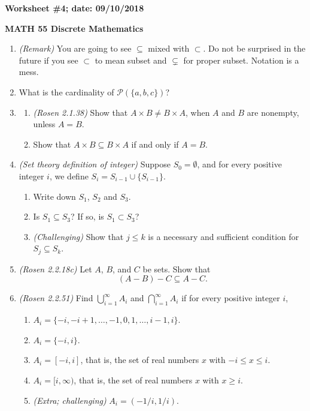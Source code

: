 \documentclass{article}
\begin{document}
{\bf Worksheet \#4; date: 09/10/2018}

{\bf MATH 55 Discrete Mathematics}

\begin{enumerate}
\item {\em (Remark)} You are going to see $\subseteq$ mixed with $\subset$. Do not be surprised in the future if you see $\subset$ to mean subset and $\subsetneq$ for proper subset. Notation is a mess.

\item What is the cardinality of $\mathcal{P}(\{a, b, c\})$?

\item
\begin{enumerate}
\item {\em (Rosen 2.1.38)} Show that $A \times B \ne B \times A$, when $A$ and $B$ are nonempty, unless $A = B$.
\item Show that $A \times B \subseteq B \times A$ if and only if $A = B$.
\end{enumerate}

\item {\em (Set theory definition of integer)} Suppose $S_0 = \emptyset$, and for every positive integer $i$, we define $S_i = S_{i-1} \cup \{S_{i-1}\}$.
\begin{enumerate}
\item Write down $S_1$, $S_2$ and $S_3$.
\item Is $S_1 \subseteq S_3$? If so, is $S_1 \subset S_3$?
\item {\em (Challenging)} Show that $j \le k$ is a necessary and sufficient condition for $S_j \subseteq S_k$.
\end{enumerate}

\item {\em (Rosen 2.2.18c)} Let $A$, $B$, and $C$ be sets. Show that
\[
	(A - B) - C \subseteq A - C.
\]

\item {\em (Rosen 2.2.51)} Find $\bigcup_{i=1}^\infty A_i$ and $\bigcap_{i=1}^\infty A_i$ if for every positive integer $i$,
\begin{enumerate}
\item $A_i = \{-i, -i+1, \ldots, -1, 0, 1, \ldots, i-1, i\}$.
\item $A_i = \{-i, i\}$.
\item $A_i = [-i, i]$, that is, the set of real numbers $x$ with $-i \le x \le i$.
\item $A_i = [i, \infty)$, that is, the set of real numbers $x$ with $x \ge i$.
\item {\em (Extra; challenging)} $A_i = (-1 / i, 1 / i)$.
\end{enumerate}


\end{enumerate}
\end{document}
